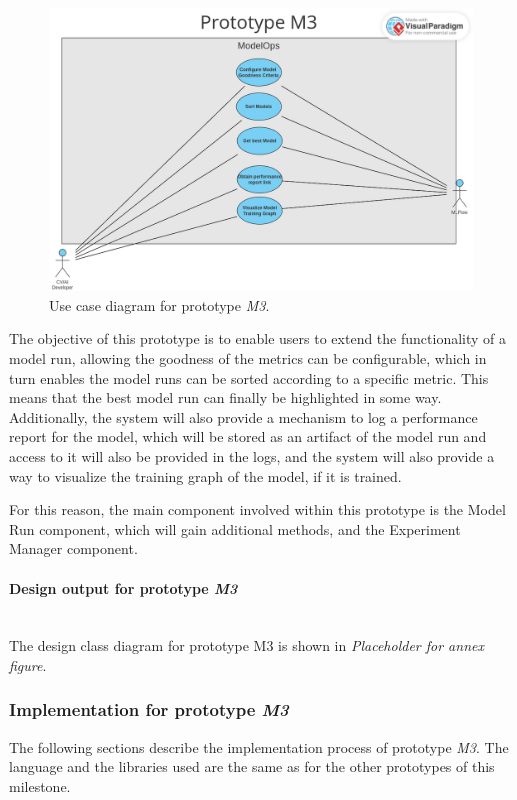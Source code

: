 \begin{figure}[H]
    \centering
    \includegraphics[width=0.7\linewidth]{figs/use-case-M3.png}
    \caption{Use case diagram for prototype \emph{M3}.}
    \label{fig:useCaseM3}
\end{figure}

The objective of this prototype is to enable users to extend the functionality of a model run, allowing the goodness of the metrics can be configurable, which in turn enables the 
model runs can be sorted according to a specific metric. This means that the best model run can finally be highlighted in some way. Additionally, the system will also provide a 
mechanism to log a performance report for the model, which will be stored as an artifact of the model run and access to it will also be provided in the logs, and the system will also provide a way to 
visualize the training graph of the model, if it is trained.

For this reason, the main component involved within this prototype is the Model Run component, which will gain additional methods, and the Experiment Manager component.

\paragraph{Design output for prototype \emph{M3}}\mbox{}\\

The design class diagram for prototype M3 is shown in \emph{Placeholder for annex figure}.

\subsubsection{Implementation for prototype \emph{M3}}

The following sections describe the implementation process of prototype \emph{M3}. The language and the libraries used are the same as for the other prototypes of this milestone.

